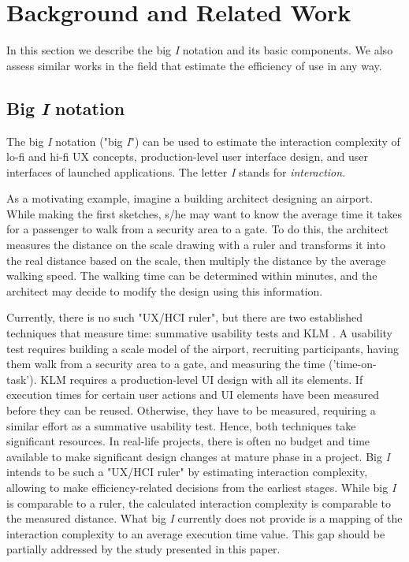 \section{Background and Related Work}
\label{Sec:Background}
In this section we describe the big \textit{I} notation and its basic components. We also assess similar works in the field that estimate the efficiency of use in any way. 


\subsection{Big \textit{I} notation}
The big \textit{I} notation \cite{degen2022big} ("big \textit{I}") can be used to estimate the interaction complexity of lo-fi and hi-fi UX concepts, production-level user interface design, and user interfaces of launched applications. The letter \textit{I} stands for \textit{interaction}. 

As a motivating example, imagine a building architect designing an airport. While making the first sketches, s/he may want to know the average time it takes for a passenger to walk from a security area to a gate. To do this, the architect measures the distance on the scale drawing with a ruler and transforms it into the real distance based on the scale, then multiply the distance by the average walking speed. The walking time can be determined within minutes, and the architect may decide to modify the design using this information.

Currently, there is no such "UX/HCI ruler", but there are two established techniques that measure time: summative usability tests \cite{RubinChisnellSpool2008-UsabilityTesting-book} and KLM \cite{Card1980-KLM-Article,CardNewellMoran1983-book,Olson1990-KLM-HCI-article}. A usability test requires building a scale model of the airport, recruiting participants, having them walk from a security area to a gate, and measuring the time ('time-on-task'). KLM requires a production-level UI design with all its elements. 
If execution times for certain user actions and UI elements have been measured before they can be reused.
Otherwise, they have to be measured, requiring a similar effort as a summative usability test. Hence, both techniques take significant resources. In real-life projects, there is often no budget and time available to make significant design changes at mature phase in a project.
Big \textit{I} intends to be such a "UX/HCI ruler" by estimating interaction complexity, allowing to make efficiency-related decisions from the earliest stages.
While big \textit{I} is comparable to a ruler, the calculated interaction complexity is comparable to the measured distance. What big \textit{I} currently does not provide is a mapping of the interaction complexity to an average execution time value. This gap should be partially addressed by the study presented in this paper.


